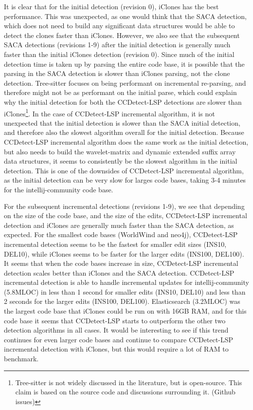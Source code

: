 It is clear that for the initial detection (revision 0), iClones has the best performance.
This was unexpected, as one would think that the SACA detection, which does not need to
build any significant data structures would be able to detect the clones faster than
iClones. However, we also see that the subsequent SACA detections (revisions 1-9) after
the initial detection is generally much faster than the initial iClones detection
(revision 0). Since much of the initial detection time is taken up by parsing the entire
code base, it is possible that the parsing in the SACA detection is slower than iClones
parsing, not the clone detection. Tree-sitter focuses on being performant on incremental
re-parsing, and therefore might not be as performant on the initial parse, which could
explain why the initial detection for both the CCDetect-LSP detections are slower than
iClones\footnote{Tree-sitter is not widely discussed in the literature, but is
open-source. This claim is based on the source code and discussions surrounding it.
(Github issues)}. In the case of CCDetect-LSP incremental algorithm, it is not unexpected
that the initial detection is slower than the SACA initial detection, and therefore also
the slowest algorithm overall for the initial detection. Because CCDetect-LSP incremental
algorithm does the same work as the initial detection, but also needs to build the
wavelet-matrix and dynamic extended suffix array data structures, it seems to consistently
be the slowest algorithm in the initial detection. This is one of the downsides of
CCDetect-LSP incremental algorithm, as the initial detection can be very slow for larges
code bases, taking 3-4 minutes for the intellij-community code base.


For the subsequent incremental detections (revisions 1-9), we see that depending on the
size of the code base, and the size of the edits, CCDetect-LSP incremental detection and
iClones are generally much faster than the SACA detection, as expected. For the smallest
code bases (WorldWind and neo4j), CCDetect-LSP incremental detection seems to be the
fastest for smaller edit sizes (INS10, DEL10), while iClones seems to be faster for the
larger edits (INS100, DEL100). It seems that when the code bases increase in size,
CCDetect-LSP incremental detection scales better than iClones and the SACA detection.
CCDetect-LSP incremental detection is able to handle incremental updates for
intellij-community (5.8MLOC) in less than 1 second for smaller edits (INS10, DEL10) and
less than 2 seconds for the larger edits (INS100, DEL100). Elasticsearch (3.2MLOC) was the
largest code base that iClones could be run on with 16GB RAM, and for this code base it
seems that CCDetect-LSP starts to outperform the other two detection algorithms in all
cases. It would be interesting to see if this trend continues for even larger code bases
and continue to compare CCDetect-LSP incremental detection with iClones, but this would
require a lot of RAM to benchmark.

